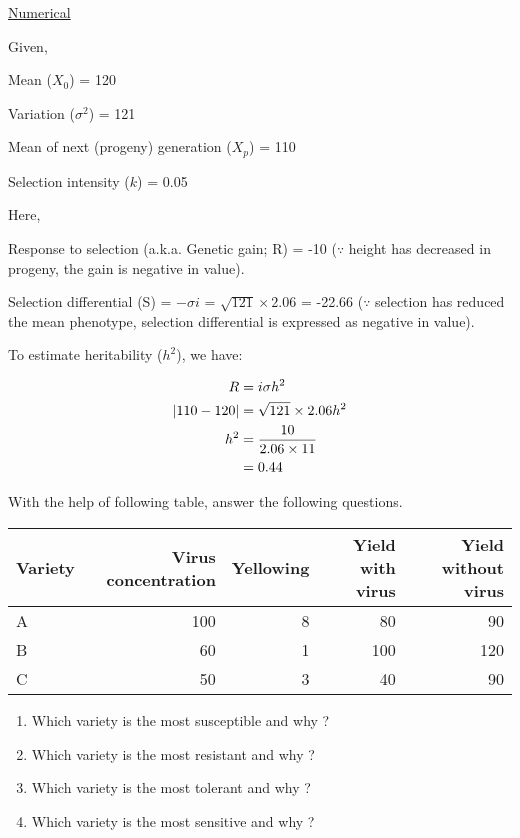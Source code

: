 \documentclass[
  answers,addpoints,12pt]{exam}
\providecommand{\tightlist}{%
  \setlength{\itemsep}{0pt}\setlength{\parskip}{0pt}}
\newcommand{\bsolution}{\begin{solution}}
\newcommand{\esolution}{\end{solution}}
\begin{document}
\bsolution

\underline{Numerical}

Given,

Mean (\(X_0\)) = 120

Variation (\(\sigma^2\)) = 121

Mean of next (progeny) generation (\(X_p\)) = 110

Selection intensity (\(k\)) = 0.05

Here,

Response to selection (a.k.a. Genetic gain; R) = -10 (\(\because\) height has decreased in progeny, the gain is negative in value).

Selection differential (S) = \(-\sigma i\) = \(\sqrt{121} \times 2.06\) = -22.66 (\(\because\) selection has reduced the mean phenotype, selection differential is expressed as negative in value).

To estimate heritability (\(h^2\)), we have:

\begin{align}
R &= i \sigma h^{2} \notag \\
|110-120|  &= \sqrt{121} \times 2.06 h^{2} \notag \\
h^2 &= \frac{10}{2.06 \times 11} \notag \\
  &= 0.44 \notag
\end{align}

\esolution

\question[4] \label{quest:fourth}

With the help of following table, answer the following questions.

\begin{table}[H]
\centering
\begin{tabular}{lrrrr}
\toprule
Variety & Virus concentration & Yellowing & Yield with virus & Yield without virus\\
\midrule
A & 100 & 8 & 80 & 90\\
B & 60 & 1 & 100 & 120\\
C & 50 & 3 & 40 & 90\\
\bottomrule
\end{tabular}
\end{table}

\begin{enumerate}
\def\labelenumi{\arabic{enumi}.}
\tightlist
\item
  Which variety is the most susceptible and why ?
\item
  Which variety is the most resistant and why ?
\item
  Which variety is the most tolerant and why ?
\item
  Which variety is the most sensitive and why ?
\end{enumerate}
\end{document}
